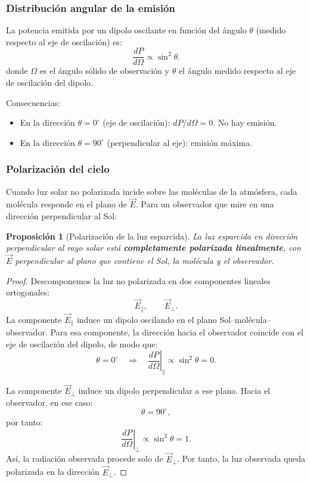 \documentclass[12pt, a4paper]{article}
\theoremstyle{plain}
\newtheorem{proposicion}[teorema]{Proposición}
\theoremstyle{definition}
\theoremstyle{remark}
\newcommand{\ve}[1]{\vec{#1}}
\begin{document}
\subsubsection{Distribución angular de la emisión}

La potencia emitida por un dipolo oscilante en función del ángulo $\theta$
(medido respecto al eje de oscilación) es:
\begin{equation}
  \frac{dP}{d\Omega} \propto \sin^2\theta. \label{eq:dipolo_angular}
\end{equation}
donde $\Omega$ es el ángulo sólido de observación y $\theta$ el ángulo medido respecto al eje de oscilación del dipolo.

Consecuencias:
\begin{itemize}
  \item En la dirección $\theta=0^{\circ}$ (eje de oscilación): $dP/d\Omega=0$.
        No hay emisión.
  \item En la dirección $\theta=90^{\circ}$ (perpendicular al eje): emisión
        máxima.
\end{itemize}

\subsubsection{Polarización del cielo}

Cuando luz solar no polarizada incide sobre las moléculas de la atmósfera,
cada molécula responde en el plano de $\ve{E}$. Para un observador que mire
en una dirección perpendicular al Sol:

\begin{proposicion}[Polarización de la luz esparcida]
La luz esparcida en dirección perpendicular al rayo solar está
\textbf{completamente polarizada linealmente}, con $\ve{E}$ perpendicular
al plano que contiene el Sol, la molécula y el observador.
\end{proposicion}

\begin{proof}
Descomponemos la luz no polarizada en dos componentes lineales ortogonales:
\[
  \ve{E}_\parallel,
  \qquad
  \ve{E}_\perp.
\]
La componente $\ve{E}_\parallel$ induce un dipolo oscilando en el plano
Sol--molécula--observador.
Para esa componente, la dirección hacia el observador coincide con el eje de
oscilación del dipolo, de modo que:
\[
  \theta=0^{\circ}
  \quad\Rightarrow\quad
  \left.\frac{dP}{d\Omega}\right|_{\parallel}\propto \sin^2\theta=0.
\]

La componente $\ve{E}_\perp$ induce un dipolo perpendicular a ese plano.
Hacia el observador, en ese caso:
\[
  \theta=90^{\circ},
\]
por tanto:
\[
  \left.\frac{dP}{d\Omega}\right|_{\perp}\propto \sin^2\theta=1.
\]
Así, la radiación observada procede solo de $\ve{E}_\perp$.
Por tanto, la luz observada queda polarizada en la dirección $\ve{E}_\perp$.
\end{proof}
\end{document}

